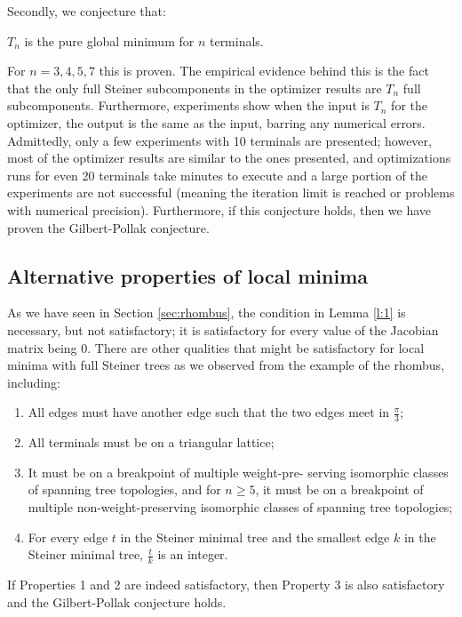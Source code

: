 \documentclass{mpaper}
\begin{document}
Secondly, we conjecture that:

\begin{conjecture}\label{c:2}
  $T_n$ is the pure global minimum for $n$ terminals.
\end{conjecture}

For $n=3,4,5,7$ this is proven. The empirical evidence behind this is the fact that the only full Steiner subcomponents in the optimizer results are $T_n$ full subcomponents. Furthermore, experiments show when the input is $T_n$ for the optimizer, the output is the same as the input, barring any numerical errors. Admittedly, only a few experiments with 10 terminals are presented; however, most of the optimizer results are similar to the ones presented, and optimizations runs for even 20 terminals take minutes to execute and a large portion of the experiments are not successful (meaning the iteration limit is reached or problems with numerical precision). Furthermore, if this conjecture holds, then we have proven the Gilbert-Pollak conjecture.

\subsection{Alternative properties of local minima}
As we have seen in Section \ref{sec:rhombus}, the condition in Lemma \ref{l:1} is necessary, but not satisfactory; it is satisfactory for every value of the Jacobian matrix being 0. There are other qualities that might be satisfactory for local minima with full Steiner trees as we observed from the example of the rhombus, including:
\begin{enumerate}
  \item All edges must have another edge such that the two edges meet in $\frac{\pi}{3}$;
  \item All terminals must be on a triangular lattice;
  \item It must be on a breakpoint of multiple weight-pre- serving isomorphic classes of spanning tree topologies, and for $n\geq5$, it must be on a breakpoint of multiple non-weight-preserving isomorphic classes of spanning tree topologies;
  \item For every edge $t$ in the Steiner minimal tree and the smallest edge $k$ in the Steiner minimal tree, $\frac{t}{k}$ is an integer.
\end{enumerate}
If Properties 1 and 2 are indeed satisfactory, then Property 3 is also satisfactory and the Gilbert-Pollak conjecture holds.
\end{document}
